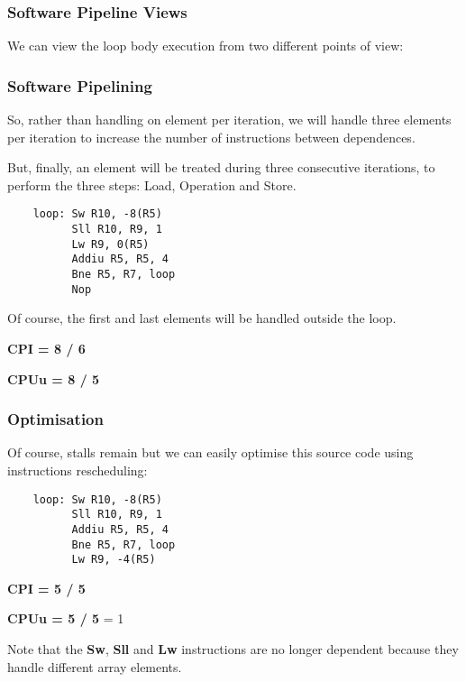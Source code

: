 
\begin{frame}
  \frametitle{Software Pipeline Views}

  We can view the loop body execution from two different points of view:

  \begin{center}
  \end{center}
\end{frame}


\begin{frame}[containsverbatim]
  \frametitle{Software Pipelining}

  So, rather than handling on element per iteration, we will handle
  three elements per iteration to increase the number of instructions
  between dependences.

  \nl

  But, finally, an element will be treated during three consecutive
  iterations, to perform the three steps: Load, Operation and Store.

  \begin{verbatim}
    loop: Sw R10, -8(R5)
          Sll R10, R9, 1
          Lw R9, 0(R5)
          Addiu R5, R5, 4
          Bne R5, R7, loop
          Nop
  \end{verbatim}

  Of course, the first and last elements will be handled outside the loop.

  \nl

  \textbf{CPI = 8 / 6}

  \textbf{CPUu = 8 / 5}
\end{frame}


\begin{frame}[containsverbatim]
  \frametitle{Optimisation}

  Of course, stalls remain but we can easily optimise this source code
  using instructions rescheduling:

  \begin{verbatim}
    loop: Sw R10, -8(R5)
          Sll R10, R9, 1
          Addiu R5, R5, 4
          Bne R5, R7, loop
          Lw R9, -4(R5)
  \end{verbatim}

  \textbf{CPI = 5 / 5}

  \textbf{CPUu = 5 / 5} \alert{= 1}

  \nl

  Note that the \textbf{Sw}, \textbf{Sll} and \textbf{Lw} instructions
  are no longer dependent because they handle different array elements.
\end{frame}

